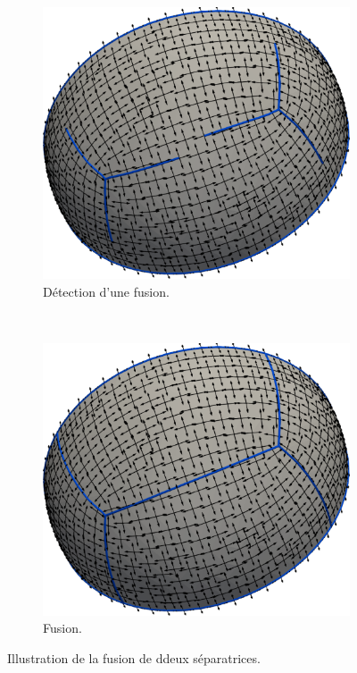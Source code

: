 \begin{figure}[h!]
\centering
\begin{subfigure}{0.57\textwidth}
    \includegraphics[width=\textwidth]{images/detect_fusion_space.pdf}
    \caption{Détection d'une fusion.}
\end{subfigure}
\\[0.5cm]
\begin{subfigure}{0.57\textwidth}
    \includegraphics[width=\textwidth]{images/fusion_space.pdf}
    \caption{Fusion.}
\end{subfigure}
\caption{Illustration de la fusion de ddeux séparatrices.}
\label{fig:fusion_space}
\end{figure}

